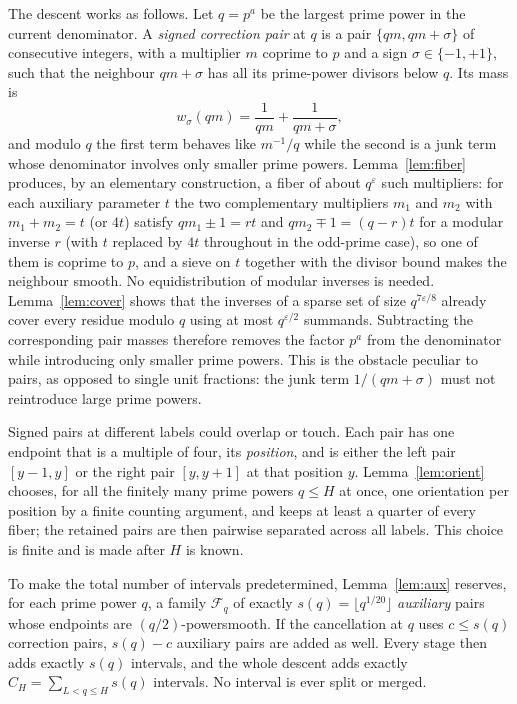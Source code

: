 \documentclass[11pt,letterpaper]{article}
\numberwithin{equation}{section}
\theoremstyle{plain}
\theoremstyle{remark}
\newcommand{\cF}{\mathcal F}
\begin{document}
The descent works as follows. Let $q=p^a$ be the largest prime power in the current denominator. A \emph{signed correction pair} at $q$ is a pair $\{qm,qm+\sigma\}$ of consecutive integers, with a multiplier $m$ coprime to $p$ and a sign $\sigma\in\{-1,+1\}$, such that the neighbour $qm+\sigma$ has all its prime-power divisors below $q$. Its mass is
\[
w_\sigma(qm)=\frac1{qm}+\frac1{qm+\sigma},
\]
and modulo $q$ the first term behaves like $m^{-1}/q$ while the second is a junk term whose denominator involves only smaller prime powers. Lemma~\ref{lem:fiber} produces, by an elementary construction, a fiber of about $q^{\varepsilon}$ such multipliers: for each auxiliary parameter $t$ the two complementary multipliers $m_1$ and $m_2$ with $m_1+m_2=t$ (or $4t$) satisfy $qm_1\pm1=rt$ and $qm_2\mp1=(q-r)t$ for a modular inverse $r$ (with $t$ replaced by $4t$ throughout in the odd-prime case), so one of them is coprime to $p$, and a sieve on $t$ together with the divisor bound makes the neighbour smooth. No equidistribution of modular inverses is needed. Lemma~\ref{lem:cover} shows that the inverses of a sparse set of size $q^{7\varepsilon/8}$ already cover every residue modulo $q$ using at most $q^{\varepsilon/2}$ summands. Subtracting the corresponding pair masses therefore removes the factor $p^a$ from the denominator while introducing only smaller prime powers. This is the obstacle peculiar to pairs, as opposed to single unit fractions: the junk term $1/(qm+\sigma)$ must not reintroduce large prime powers.

Signed pairs at different labels could overlap or touch. Each pair has one endpoint that is a multiple of four, its \emph{position}, and is either the left pair $[y-1,y]$ or the right pair $[y,y+1]$ at that position $y$. Lemma~\ref{lem:orient} chooses, for all the finitely many prime powers $q\le H$ at once, one orientation per position by a finite counting argument, and keeps at least a quarter of every fiber; the retained pairs are then pairwise separated across all labels. This choice is finite and is made after $H$ is known.

To make the total number of intervals predetermined, Lemma~\ref{lem:aux} reserves, for each prime power $q$, a family $\cF_q$ of exactly $s(q)=\lfloor q^{1/20}\rfloor$ \emph{auxiliary} pairs whose endpoints are $(q/2)$-powersmooth. If the cancellation at $q$ uses $c\le s(q)$ correction pairs, $s(q)-c$ auxiliary pairs are added as well. Every stage then adds exactly $s(q)$ intervals, and the whole descent adds exactly $C_H=\sum_{L<q\le H}s(q)$ intervals. No interval is ever split or merged.
\end{document}
